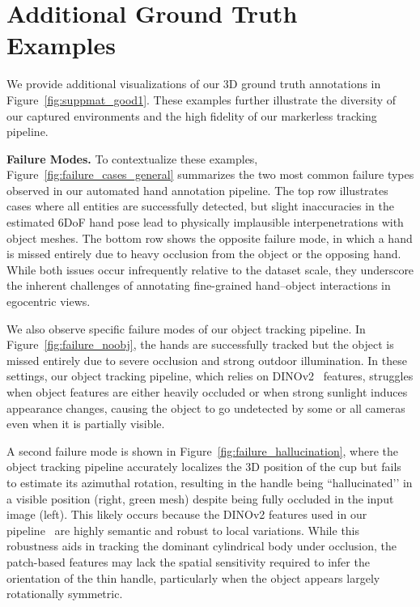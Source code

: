 \documentclass[10pt,twocolumn,letterpaper]{article}
\begin{document}
\section{Additional Ground Truth Examples}

We provide additional visualizations of our 3D ground truth annotations in Figure~\ref{fig:suppmat_good1}. 
These examples further illustrate the diversity of our captured environments and the high fidelity of our markerless tracking pipeline. 

\textbf{Failure Modes.} To contextualize these examples, Figure~\ref{fig:failure_cases_general} summarizes the two most common failure types observed in our automated hand annotation pipeline. The top row illustrates cases where all entities are successfully detected, but slight inaccuracies in the estimated 6DoF hand pose lead to physically implausible interpenetrations with object meshes. The bottom row shows the opposite failure mode, in which a hand is missed entirely due to heavy occlusion from the object or the opposing hand. While both issues occur infrequently relative to the dataset scale, they underscore the inherent challenges of annotating fine-grained hand–object interactions in egocentric views.

We also observe specific failure modes of our object tracking pipeline. In Figure~\ref{fig:failure_noobj}, the hands are successfully tracked but the object is missed entirely due to severe occlusion and strong outdoor illumination. In these settings, our object tracking pipeline, which relies on DINOv2~\cite{oquab2023dinov2} features, struggles when object features are either heavily occluded or when strong sunlight induces appearance changes, causing the object to go undetected by some or all cameras even when it is partially visible.

A second failure mode is shown in Figure~\ref{fig:failure_hallucination}, where the object tracking pipeline accurately localizes the 3D position of the cup but fails to estimate its azimuthal rotation, resulting in the handle being “hallucinated’’ in a visible position (right, green mesh) despite being fully occluded in the input image (left). This likely occurs because the DINOv2 features used in our pipeline~\cite{nguyen2023cnos, ornek2024foundpose, nguyen2025gotrack} are highly semantic and robust to local variations. While this robustness aids in tracking the dominant cylindrical body under occlusion, the patch-based features may lack the spatial sensitivity required to infer the orientation of the thin handle, particularly when the object appears largely rotationally symmetric.
\end{document}
